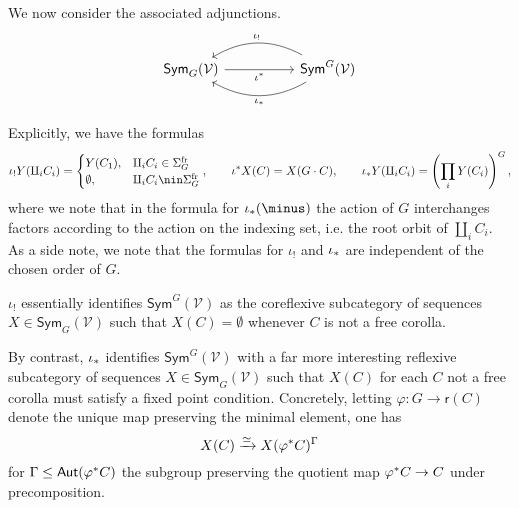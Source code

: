 \documentclass[a4paper,10pt]{article}%
\begin{document}
We now consider the associated adjunctions.
\begin{equation}\label{TWOADJOINTS EQ}
  \begin{tikzcd}[column sep =5em]
    \mathsf{Sym}_G(\mathcal{V}) \ar{r}[swap]{\iota^{\**}} 
    &
    \mathsf{Sym}^G(\mathcal{V})
    \ar[bend right]{l}[swap,midway]{\iota_{!}}
    \ar[bend left]{l}{\iota_{\**}}
  \end{tikzcd}
\end{equation}


Explicitly, we have the formulas
\[
\iota_!Y(\amalg_i C_i)=
\begin{cases}
  Y(C_1), & \amalg_i C_i \in \Sigma_G^{\text{fr}} \\
  \emptyset, & \amalg_i C_i \nin \Sigma_G^{\text{fr}}
\end{cases},
\qquad
\iota^{\**}X (C) = X(G \cdot C),
\qquad
\iota_{\**}Y (\amalg_i C_i)=
\left(\prod_i Y(C_i)\right)^G,
\]
where we note that in the formula for $\iota_{\**}(\minus)$
the action of $G$ interchanges factors according to the action on the indexing set, i.e. the root orbit of $\amalg_i C_i$.
As a side note, we note that the formulas for $\iota_!$ and $\iota_{\**}$ are independent of the chosen order of $G$.

\begin{remark}\label{REFLCOREFL REM}
  $\iota_!$ essentially identifies 
  $\mathsf{Sym}^G(\mathcal{V})$ as the coreflexive subcategory of sequences 
  $X \in \mathsf{Sym}_G(\mathcal{V})$ such that $X(C)=\emptyset$ whenever $C$ is not a free corolla.

  By contrast, $\iota_{\**}$ identifies 
  $\mathsf{Sym}^G(\mathcal{V})$ with a far more interesting reflexive subcategory of sequences 
  $X \in \mathsf{Sym}_G(\mathcal{V})$ 
  such that $X(C)$ for each $C$ not a free corolla must satisfy a fixed point condition. Concretely, letting 
  $\varphi \colon G \to \mathsf{r}(C)$
  denote the unique map preserving the minimal element, one has
  \[X(C) \xrightarrow{\simeq} X(\varphi^{\**}C)^{\Gamma}\]
  for 
  $\Gamma \leq \mathsf{Aut}(\varphi^{\**}C)$
  the subgroup preserving the quotient map
  $\varphi^{\**}C \to C$
  under precomposition.
\end{remark}
\end{document}
